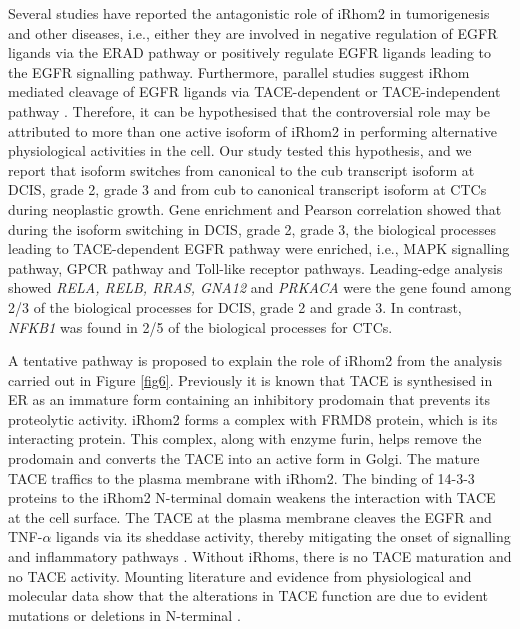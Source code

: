 \documentclass[fleqn,10pt,lineno]{wlpeerj}
\begin{document}
 Several studies have reported the antagonistic role of iRhom2 in tumorigenesis and other diseases, i.e., either they are involved in negative regulation of EGFR ligands via the ERAD pathway or positively regulate EGFR ligands leading to the EGFR signalling pathway. Furthermore, parallel studies suggest iRhom mediated cleavage of EGFR ligands via TACE-dependent or TACE-independent pathway \citep{Al-Salihi2020}. Therefore, it can be hypothesised that the controversial role may be attributed to more than one active isoform of iRhom2 in performing alternative physiological activities in the cell. Our study tested this hypothesis, and we report that isoform switches from canonical to the cub transcript isoform at DCIS, grade 2, grade 3 and from cub to canonical transcript isoform at CTCs during neoplastic growth. Gene enrichment and Pearson correlation showed that during the isoform switching in DCIS, grade 2, grade 3, the biological processes leading to TACE-dependent EGFR pathway were enriched, i.e., MAPK signalling pathway, GPCR pathway and Toll-like receptor pathways. Leading-edge analysis showed \textit{RELA, RELB, RRAS, GNA12} and \textit{PRKACA}  were the gene found among 2/3 of the biological processes for DCIS, grade 2 and grade 3. In contrast, \textit{NFKB1} was found in 2/5 of the biological processes for CTCs. 
 
A tentative pathway is proposed to explain the role of iRhom2 from the analysis carried out in Figure \ref{fig6}. Previously it is known that TACE is synthesised in ER as an immature form containing an inhibitory prodomain that prevents its proteolytic activity. iRhom2 forms a complex with FRMD8 protein, which is its interacting protein. This complex, along with enzyme furin, helps remove the prodomain and converts the TACE into an active form in Golgi. The mature TACE traffics to the plasma membrane with iRhom2. The binding of 14-3-3 proteins to the iRhom2 N-terminal domain weakens the interaction with TACE at the cell surface. The TACE at the plasma membrane cleaves the EGFR and TNF-$\alpha$ ligands via its sheddase activity, thereby mitigating the onset of signalling and inflammatory pathways  \citep{Dulloo2019}. Without iRhoms, there is no TACE maturation and no TACE activity. Mounting literature and evidence from physiological and molecular data show that the alterations in TACE function are due to evident mutations or deletions in N-terminal \citep{Blaydon2012,Brooke2014,Siggs2014,Li2015}.
 
\end{document}
